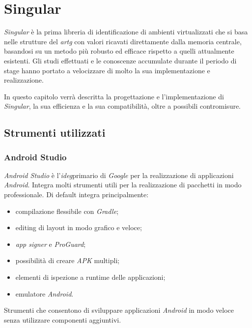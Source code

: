 
\chapter{Singular}
\label{chap:singular}

\emph{Singular} è la prima libreria di identificazione di ambienti virtualizzati che si basa nelle strutture del \emph{\gls{artg}} con valori ricavati direttamente dalla memoria centrale, basandosi su un metodo più  robusto ed efficace rispetto a quelli attualmente esistenti.
Gli studi effettuati e le conoscenze accumulate durante il periodo di stage hanno portato a velocizzare di molto la sua implementazione e realizzazione.

In questo capitolo verrà descritta la progettazione e l'implementazione di \emph{Singular}, la sua efficienza e la sua compatibilità, oltre a possibili contromisure.

\newpage

\section{Strumenti utilizzati}

\subsection*{Android Studio}

\emph{Android Studio} è l'\emph{\gls{ideg}}\glsfirstoccurspace primario di \emph{Google} per la realizzazione di applicazioni \emph{Android}. Integra molti strumenti utili per la realizzazione di pacchetti in modo professionale.
Di default integra principalmente:
\begin{itemize}
    \item compilazione flessibile con \emph{Gradle};
    \item editing di layout in modo grafico e veloce;
    \item \emph{app signer} e \emph{ProGuard};
    \item possibilità di creare \emph{APK} multipli;
    \item elementi di ispezione a runtime delle applicazioni;
    \item emulatore \emph{Android}.
\end{itemize}
Strumenti che consentono di sviluppare applicazioni \emph{Android} in modo veloce senza utilizzare componenti aggiuntivi.

